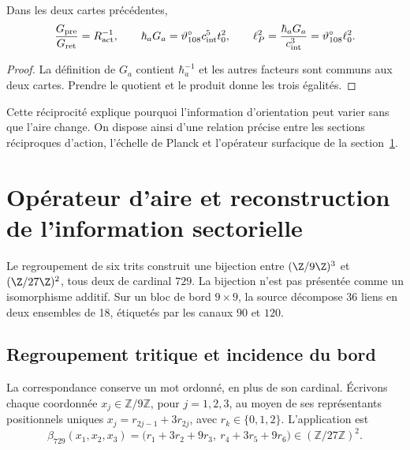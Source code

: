 \begin{proposition}
Dans les deux cartes précédentes,
\[
\frac{G_{\rm pre}}{G_{\rm ret}}=R_{\rm act}^{-1},\qquad
\hbar_aG_a=\vartheta^\circ_{108}c_{\rm int}^5t_0^2,
\qquad
\ell_P^2=\frac{\hbar_aG_a}{c_{\rm int}^3}
=\vartheta^\circ_{108}\ell_0^2.
\]
\end{proposition}
\begin{proof}
La définition de $G_a$ contient $\hbar_a^{-1}$ et les autres facteurs
sont communs aux deux cartes. Prendre le quotient et le produit donne
les trois égalités.
\end{proof}
Cette réciprocité explique pourquoi l'information d'orientation peut
varier sans que l'aire change. On dispose ainsi d'une relation précise
entre les sections réciproques d'action, l'échelle de Planck et l'opérateur surfacique
de la section~\ref{x_reciprocidad:v:ant:sec:area}.



\chapter{Opérateur d'aire et reconstruction de l'information sectorielle}
\label{x_reciprocidad:v:ant:sec:area}
Le regroupement de six trits construit une bijection entre
$(\Z/9\Z)^3$ et $(\Z/27\Z)^2$, tous deux de cardinal $729$.
La bijection n'est pas présentée comme un isomorphisme additif. Sur un bloc
de bord $9\times9$, la source décompose 36 liens en deux
ensembles de 18, étiquetés par les canaux $90$ et $120$.

\section{Regroupement tritique et incidence du bord}
\label{x_reciprocidad:v:ant:sec:ii-area-incidencia-explicita}

La correspondance conserve un mot ordonné, en plus de son cardinal.
Écrivons chaque coordonnée \(x_j\in\mathbb Z/9\mathbb Z\), pour
\(j=1,2,3\), au moyen de ses représentants positionnels uniques
\(x_j=r_{2j-1}+3r_{2j}\), avec \(r_k\in\{0,1,2\}\). L'application est
\begin{equation}
 \beta_{729}(x_1,x_2,x_3)
 =\bigl(r_1+3r_2+9r_3,\ r_4+3r_5+9r_6\bigr)
 \in(\mathbb Z/27\mathbb Z)^2.
 \label{x_reciprocidad:v:ant:eq:ii-area-beta729}
\end{equation}

